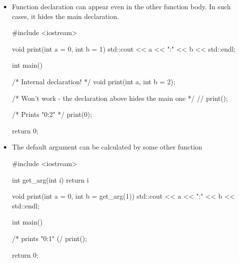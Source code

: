 \documentclass[../main]{subfiles}
\begin{document}
\begin{itemize}
    \item Function declaration can appear even in the other function body. In such cases, it hides the main declaration.
    \begin{Code}
        #include <iostream>
        
        void print(int a = 0, int b = 1)
        {
            std::cout << a << ":" << b << std::endl;
        }

        int main()
        {
            /* Internal declaration! */
            void print(int a, int b = 2);

            /* Won't work - the declaration above hides the main one */
            // print();

            /* Prints "0:2" */
            print(0);
            
            return 0;
        }
    \end{Code}

    \item The default argument can be calculated by some other function
    \begin{Code}
        #include <iostream>
        
        int get_arg(int i)
        {
            return i %
        }
        
        void print(int a = 0, int b = get_arg(1))
        {
            std::cout << a << ":" << b << std::endl;
        }
        
        int main()
        {
            /* prints "0:1" (/
            print();
            
            return 0;
        }
    \end{Code}
\end{itemize}
\end{document}
